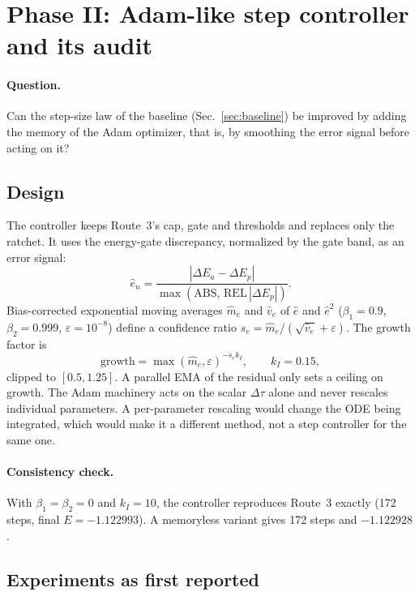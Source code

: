 \documentclass[aps,pra,reprint,superscriptaddress,nofootinbib]{revtex4-2}
\newcommand{\dt}{\Delta\tau}
\begin{document}
\section{Phase II: Adam-like step controller and its audit}
\label{sec:phase2}

\paragraph*{Question.} Can the step-size law of the baseline (Sec.~\ref{sec:baseline}) be
improved by adding the memory of the Adam optimizer, that is, by smoothing the error signal
before acting on it?

\subsection{Design}

The controller keeps Route~3's cap, gate and thresholds and replaces only the ratchet. It uses
the energy-gate discrepancy, normalized by the gate band, as an error signal:
\begin{equation}
  \hat e_n=\frac{|\Delta E_a-\Delta E_p|}{\max(\text{ABS},\,\text{REL}\,|\Delta E_p|)} .
  \label{eq:ehat}
\end{equation}
Bias-corrected exponential moving averages $\hat m_e$ and $\hat v_e$ of $\hat e$ and $\hat e^2$
($\beta_1=0.9$, $\beta_2=0.999$, $\varepsilon=10^{-8}$) define a confidence ratio
$s_e=\hat m_e/(\sqrt{\hat v_e}+\varepsilon)$. The growth factor is
\begin{equation}
  \text{growth}=\max(\hat m_e,\varepsilon)^{-s_e k_I},\qquad k_I=0.15,
  \label{eq:adamlaw}
\end{equation}
clipped to $[0.5,1.25]$. A parallel EMA of the residual only sets a ceiling on growth. The
Adam machinery acts on the scalar $\dt$ alone and never rescales individual parameters. A
per-parameter rescaling would change the ODE being integrated, which would make it a
different method, not a step controller for the same one.

\paragraph*{Consistency check.} With $\beta_1=\beta_2=0$ and $k_I=10$, the controller
reproduces Route~3 exactly (172 steps, final $E=-1.122993$). A memoryless variant gives 172
steps and $-1.122928$.

\subsection{Experiments as first reported}
\end{document}
